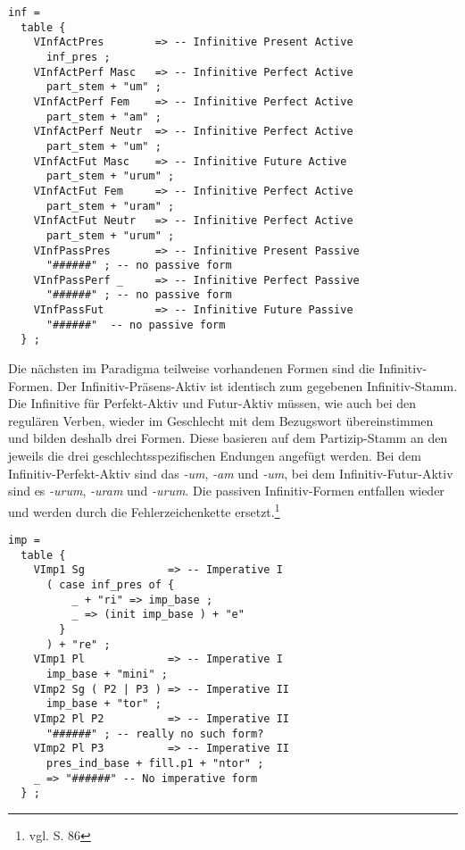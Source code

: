\begin{lstlisting}[float=h!tp,caption={Ausschnitt aus der Funktion \texttt{mkDeponent} um Infinitiv-Verbformen zu bilden (vgl. \textbf{ResLat.gf})},label={GF-Res-MkDeponent-Inf},basicstyle=\small]
inf = 
  table {
    VInfActPres        => -- Infinitive Present Active
      inf_pres ;
    VInfActPerf Masc   => -- Infinitive Perfect Active
      part_stem + "um" ;
    VInfActPerf Fem    => -- Infinitive Perfect Active
      part_stem + "am" ;
    VInfActPerf Neutr  => -- Infinitive Perfect Active
      part_stem + "um" ;
    VInfActFut Masc    => -- Infinitive Future Active
      part_stem + "urum" ;
    VInfActFut Fem     => -- Infinitive Perfect Active
      part_stem + "uram" ; 
    VInfActFut Neutr   => -- Infinitive Perfect Active
      part_stem + "urum" ;
    VInfPassPres       => -- Infinitive Present Passive
      "######" ; -- no passive form
    VInfPassPerf _     => -- Infinitive Perfect Passive
      "######" ; -- no passive form
    VInfPassFut        => -- Infinitive Future Passive
      "######"  -- no passive form
  } ;
\end{lstlisting}
Die nächsten im Paradigma teilweise vorhandenen Formen sind die In\-fi\-ni\-tiv-For\-men. Der Infinitiv-Präsens-Aktiv ist identisch zum gegebenen Infinitiv-Stamm. Die Infinitive für Perfekt-Aktiv und Futur-Aktiv müssen, wie auch bei den regulären Verben, wieder im Geschlecht mit dem Bezugswort übereinstimmen und bilden deshalb drei Formen. Diese basieren auf dem Partizip-Stamm an den jeweils die drei geschlechtsspezifischen Endungen angefügt werden. Bei dem Infinitiv-Perfekt-Aktiv sind das \textit{-um}, \textit{-am} und \textit{-um}, bei dem Infinitiv-Futur-Aktiv sind es \textit{-urum}, \textit{-uram} und \textit{-urum}. Die passiven Infinitiv-Formen entfallen wieder und werden durch die Fehlerzeichenkette ersetzt.\footnote{vgl. \cite{BAYER-LINDAUER1994} S. 86} \par
\begin{lstlisting}[float=h!tp,caption={Ausschnitt aus der Funktion \texttt{mkDeponent} um Imperativ-Verbformen zu bilden (vgl. \textbf{ResLat.gf})},label={GF-Res-MkDeponent-Imp},basicstyle=\small]
imp = 
  table {
    VImp1 Sg             => -- Imperative I
      ( case inf_pres of {
          _ + "ri" => imp_base ;
          _ => (init imp_base ) + "e" 
        }
      ) + "re" ;
    VImp1 Pl             => -- Imperative I
      imp_base + "mini" ;
    VImp2 Sg ( P2 | P3 ) => -- Imperative II
      imp_base + "tor" ;
    VImp2 Pl P2          => -- Imperative II
      "######" ; -- really no such form?
    VImp2 Pl P3          => -- Imperative II
      pres_ind_base + fill.p1 + "ntor" ;
    _ => "######" -- No imperative form
  } ;
\end{lstlisting}
